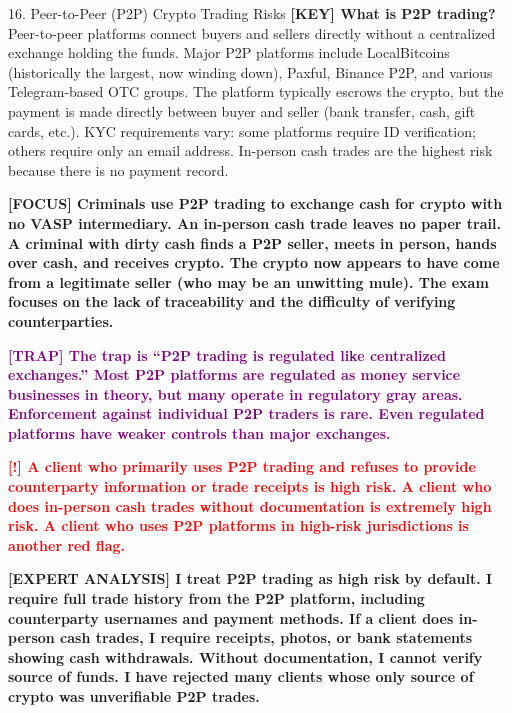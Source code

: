 \documentclass[11pt,a4paper]{beamer}
\newcommand{\redflag}[1]{\textcolor{red}{\textbf{[!] #1}}}
\newcommand{\examfocus}[1]{\textcolor{orange!80!black}{\textbf{[FOCUS] #1}}}
\newcommand{\trap}[1]{\textcolor{purple}{\textbf{[TRAP] #1}}}
\newcommand{\keyterm}[1]{\textcolor{red!80!black}{\textbf{[KEY] #1}}}
\newcommand{\expert}[1]{\textcolor{blue!70!black}{\textbf{[EXPERT ANALYSIS] #1}}}
\begin{document}
	\begin{frame}{16. Peer-to-Peer (P2P) Crypto Trading Risks}
		\tiny
		\keyterm{What is P2P trading?} Peer-to-peer platforms connect buyers and sellers directly without a centralized exchange holding the funds. Major P2P platforms include LocalBitcoins (historically the largest, now winding down), Paxful, Binance P2P, and various Telegram-based OTC groups. The platform typically escrows the crypto, but the payment is made directly between buyer and seller (bank transfer, cash, gift cards, etc.). KYC requirements vary: some platforms require ID verification; others require only an email address. In-person cash trades are the highest risk because there is no payment record.
		
		\vspace{0.1cm}
		\examfocus{Criminals use P2P trading to exchange cash for crypto with no VASP intermediary. An in-person cash trade leaves no paper trail. A criminal with dirty cash finds a P2P seller, meets in person, hands over cash, and receives crypto. The crypto now appears to have come from a legitimate seller (who may be an unwitting mule). The exam focuses on the lack of traceability and the difficulty of verifying counterparties.}
		
		\vspace{0.1cm}
		\trap{The trap is “P2P trading is regulated like centralized exchanges.” Most P2P platforms are regulated as money service businesses in theory, but many operate in regulatory gray areas. Enforcement against individual P2P traders is rare. Even regulated platforms have weaker controls than major exchanges.}
		
		\vspace{0.1cm}
		\redflag{A client who primarily uses P2P trading and refuses to provide counterparty information or trade receipts is high risk. A client who does in-person cash trades without documentation is extremely high risk. A client who uses P2P platforms in high-risk jurisdictions is another red flag.}
		
		\vspace{0.1cm}
		\expert{I treat P2P trading as high risk by default. I require full trade history from the P2P platform, including counterparty usernames and payment methods. If a client does in-person cash trades, I require receipts, photos, or bank statements showing cash withdrawals. Without documentation, I cannot verify source of funds. I have rejected many clients whose only source of crypto was unverifiable P2P trades.}
	\end{frame}
	
\end{document}
